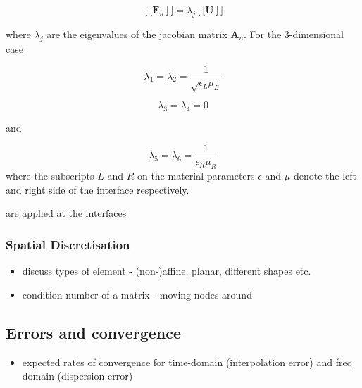 $$
\left[[ \mathbf{F}_n \right]] = \lambda_j \left[[ \mathbf{U} \right]]
$$

where $\lambda_j$ are the eigenvalues of the jacobian matrix $\mathbf{A}_n$. For the 3-dimensional case

$$
\lambda_1 = \lambda_2 = \frac{1}{\sqrt{\epsilon_L \mu_L}}
$$

$$
\lambda_3 = \lambda_4 = 0
$$

and

$$
\lambda_5 = \lambda_6 = \frac{1}{\epsilon_R \mu_R}
$$
where the subscripts  $L$ and $R$ on the material parameters $\epsilon$ and $\mu$ denote the left and right side of the interface respectively.

are applied at the interfaces

\subsubsection{Spatial Discretisation}
\begin{itemize}
	\item discuss types of element - (non-)affine, planar, different shapes etc.
	\item condition number of a matrix - moving nodes around %
\end{itemize}

\subsection{Errors and convergence}
\begin{itemize}
  \item expected rates of convergence for time-domain (interpolation error) and freq domain (dispersion error)
\end{itemize}
